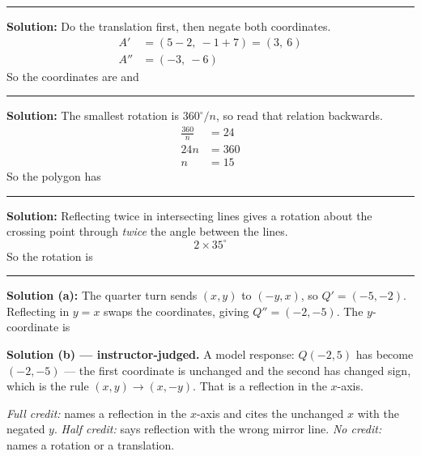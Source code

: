 \documentclass[12pt]{article}
\begin{document}
\vspace{0.2cm}\noindent\rule{\linewidth}{0.2pt}


\textbf{Solution:} Do the translation first, then negate both coordinates.
\begin{align*}
  A' &= (5 - 2,\ -1 + 7) = (3,\ 6) \\
  A'' &= (-3,\ -6)
\end{align*}
So the coordinates are  and 

\vspace{0.2cm}\noindent\rule{\linewidth}{0.2pt}


\textbf{Solution:} The smallest rotation is $360^\circ / n$, so read that relation backwards.
\begin{align*}
  \frac{360}{n} &= 24 \\
  24n &= 360 \\
  n &= 15
\end{align*}
So the polygon has 

\vspace{0.2cm}\noindent\rule{\linewidth}{0.2pt}


\textbf{Solution:} Reflecting twice in intersecting lines gives a rotation about the crossing point through \emph{twice} the angle between the lines.
\[ 2 \times 35^\circ \]
So the rotation is 

\vspace{0.2cm}\noindent\rule{\linewidth}{0.2pt}


\textbf{Solution (a):} The quarter turn sends $(x, y)$ to $(-y, x)$, so $Q' = (-5, -2)$. Reflecting in $y = x$ swaps the coordinates, giving $Q'' = (-2, -5)$. The $y$-coordinate is 

\textbf{Solution (b) --- instructor-judged.} A model response: $Q(-2, 5)$ has become $(-2, -5)$ --- the first coordinate is unchanged and the second has changed sign, which is the rule $(x, y) \to (x, -y)$. That is a reflection in the $x$-axis.

\emph{Full credit:} names a reflection in the $x$-axis and cites the unchanged $x$ with the negated $y$. \emph{Half credit:} says reflection with the wrong mirror line. \emph{No credit:} names a rotation or a translation.
\end{document}
